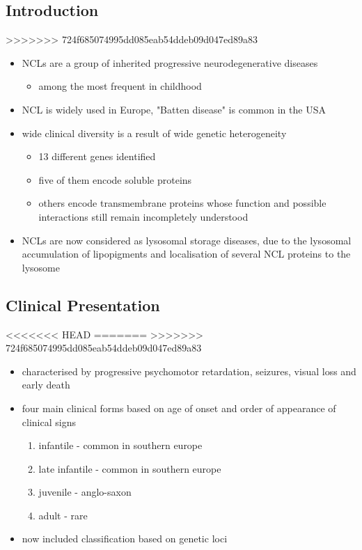 \documentclass[fontsize=12pt]{scrartcl}
\begin{document}
\begin{enumerate}
\begin{enumerate}
\begin{enumerate}
\begin{enumerate}
\begin{table}[htbp]
\begin{enumerate}
\begin{enumerate}
\begin{enumerate}
\subsection{Introduction}
\label{sec:org34851ce}
>>>>>>> 724f685074995dd085eab54ddeb09d047ed89a83
\begin{itemize}
\item NCLs are a group of inherited progressive neurodegenerative diseases
\begin{itemize}
\item among the most frequent in childhood
\end{itemize}
\item NCL is widely used in Europe, "Batten disease" is common in the USA
\item wide clinical diversity is a result of  wide genetic heterogeneity
\begin{itemize}
\item 13 different genes identified
\item five of them encode soluble proteins
\item others encode transmembrane proteins whose function and possible
interactions still remain incompletely understood
\end{itemize}
\item NCLs are now considered as lysosomal storage diseases, due to the
lysosomal accumulation of lipopigments and localisation of several
NCL proteins to the lysosome
\end{itemize}

\subsection{Clinical Presentation}
<<<<<<< HEAD
\label{sec:orgd889c39}
=======
\label{sec:org52861d7}
>>>>>>> 724f685074995dd085eab54ddeb09d047ed89a83
\begin{itemize}
\item characterised by progressive psychomotor retardation, seizures,
visual loss and early death
\item four main clinical forms based on age of onset and order of
appearance of clinical signs
\begin{enumerate}
\item infantile - common in southern europe
\item late infantile - common in southern europe
\item juvenile - anglo-saxon
\item adult - rare
\end{enumerate}
\item now included classification based on genetic loci
\end{itemize}


\end{enumerate}
\end{enumerate}
\end{enumerate}
\end{table}
\end{enumerate}
\end{enumerate}
\end{enumerate}
\end{enumerate}
\end{document}
